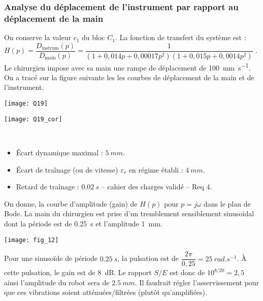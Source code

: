 \begin{multicols}{2}
\subsubsection*{Analyse du déplacement de l’instrument par rapport au déplacement de la main}
\ifprof
\else
On conserve la valeur $c_1$ du bloc $C_1$. La fonction de transfert du système est : $H(p)=\dfrac{D_{\text{instrum}}(p)}{D_{\text{main}}(p)}=\dfrac{1}{\left(1+0,014p+0,00017p^2 \right)\left( 1+0,015p+0,0014p^2\right)}$ .
Le chirurgien impose avec sa main une rampe de déplacement  de \SI{100}{mm.s^{-1}}. On a tracé sur la figure suivante les les courbes de déplacement de la main et de l’instrument.


\begin{center}
\texttt{[image: Q19]}
\end{center}
\fi


\ifprof

\begin{center}
\texttt{[image: Q19\_cor]}
\end{center}

\begin{corrige}~\\
\begin{itemize}
\item Écart dynamique maximal : $\SI{5}{mm}$.
\item Écart de traînage (ou de vitesse) $\varepsilon_v$ en régime établi : $\SI{4}{mm}$.
\item Retard de traînage : $\SI{0,02}{s}$ -- cahier des charges validé -- Req 4.
\end{itemize}
\end{corrige}
\else
\fi


On donne, la courbe d’amplitude (gain) de $H(p)$ pour $p = j\omega$ dans le plan de Bode. 
La main du chirurgien est prise d’un tremblement sensiblement sinusoïdal dont la période est de \SI{0,25}{s} et l’amplitude \SI{1}{mm}. 


\begin{center}
\texttt{[image: fig\_12]}
\end{center}

\ifprof
\begin{corrige}
Pour une sinusoïde de période $\SI{0,25}{s}$, la pulsation est de $\dfrac{2\pi}{0,25} = \SI{25}{rad.s^{-1}}$.
À cette pulsation, le gain est de \SI{8}{dB}. Le rapport $S/E$ est donc de $10^{8/20} = 2,5$ ainsi l'amplitude du robot sera de $\SI{2,5}{mm}$. Il faudrait régler l'asservissement pour que ces vibrations soient atténuées/filtrées (plutôt qu'amplifiées).
\end{corrige}
\else
\fi


\end{multicols}
